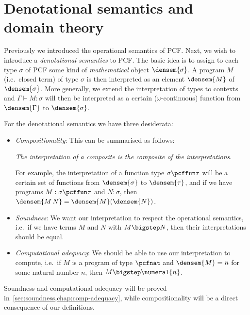 \chapter[{Denotational semantics and domain theory}]{Denotational semantics and \\ domain theory}\label{chap:domains}

Previously we introduced the operational semantics of PCF. Next, we wish to
introduce a \emph{denotational semantics} to PCF. The basic idea is to assign to
each type \(\sigma\) of PCF some kind of \emph{mathematical} object
\(\densem{\sigma}\).
%
A program \(M\) (i.e.\ closed term) of type \(\sigma\) is then interpreted as
an element \(\densem{M}\) of \(\densem{\sigma}\).
%
More generally, we extend the interpretation of types to contexts and
\(\Gamma \vdash M : \sigma\) will then be interpreted as a certain
(\(\omega\)-continuous) function from \(\densem{\Gamma}\) to
\(\densem{\sigma}\).

For the denotational semantics we have three desiderata:

\begin{itemize}[itemsep=2mm,topsep=3mm]
\item\emph{Compositionality}: This can be summarised as follows:
  \begin{displayquote}
    \emph{The interpretation of a composite is the composite of the interpretations}.
  \end{displayquote}

  For example, the interpretation of a function type \(\sigma \pcffun \tau\)
  will be a certain set of functions from \(\densem{\sigma}\) to
  \(\densem{\tau}\), and if we have programs \(M : \sigma \pcffun \tau\) and
  \(N : \sigma\), then \(\densem{M \, N} = \densem{M}(\densem{N})\).
\item\emph{Soundness}: We want our interpretation to respect the operational
  semantics, i.e.\ if we have terms \(M\) and \(N\) with
  \(M \bigstep N\), then their interpretations should be equal.
\item\emph{Computational adequacy}: We should be able to use our
  interpretation to compute, i.e.\ if \(M\) is a program of type \(\pcfnat\)
  and \(\densem{M} = n\) for some natural number \(n\), then
  \(M \bigstep \numeral{n}\).
\end{itemize}

Soundness and computational adequacy will be proved
in~\cref{sec:soundness,chap:comp-adequacy}, while compositionality will be a
direct consequence of our definitions.

